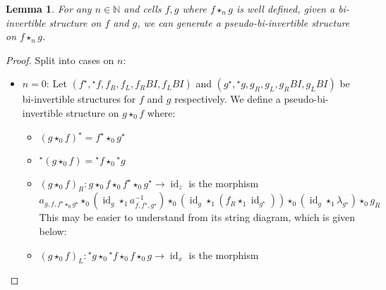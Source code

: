 \documentclass{article}
\newtheorem{lemma}{Lemma}
\theoremstyle{definition}
\theoremstyle{remark}
\DeclareMathOperator{\id}{id}
\newcommand{\linv}[1]{{}^\star\!#1}
\newcommand{\rinv}[1]{#1^\star}
\newcommand{\comp}{\star}
\begin{document}
\begin{lemma}\label{composition-lemma}
  For any \(n \in \mathbb{N}\) and cells \(f,g\) where \(f \comp_n g\) is well defined, given a bi-invertible structure on \(f\) and \(g\), we can generate a pseudo-bi-invertible structure on \(f \comp_n g\).
\end{lemma}
\begin{proof}
  Split into cases on \(n\):
  \begin{itemize}
  \item \(n = 0\): Let \((\rinv f, \linv f, f_R, f_L, f_R{}BI, f_L{}BI)\) and \((\rinv g, \linv g, g_R, g_L, g_R{}BI, g_L{}BI)\) be bi-invertible structures for \(f\) and \(g\) respectively. We define a pseudo-bi-invertible structure on \(g \comp_0 f\) where:
    \begin{itemize}
    \item \(\rinv {(g \comp_0 f)} = \rinv f \comp_0 \rinv g\)
    \item \(\linv {(g \comp_0 f)} = \linv f \comp_0 \linv g\)
    \item \({(g \comp_0 f)}_R : g \comp_0 f \comp_0 \rinv f \comp_0 \rinv g \to \id_z\) is the morphism
      \begin{equation*}
        a_{g, f, \rinv f \comp_0 \rinv g} \comp_0 (\id_g \comp_1 a_{f,\rinv f, \rinv g}^{-1}) \comp_0 (\id_g \comp_1 (f_R \comp_1 \id_{\rinv g})) \comp_0 (\id_g \comp_1 \lambda_{\rinv g}) \comp_0 g_R
      \end{equation*}
      This may be easier to understand from its string diagram, which is given below:
      \begin{center}
      \end{center}
    \item \({(g \comp_0 f)}_L : \linv g \comp_0 \linv f \comp_0 f \comp_0 g \to \id_x\) is the morphism

\end{itemize}
\end{itemize}
\end{proof}
\end{document}
